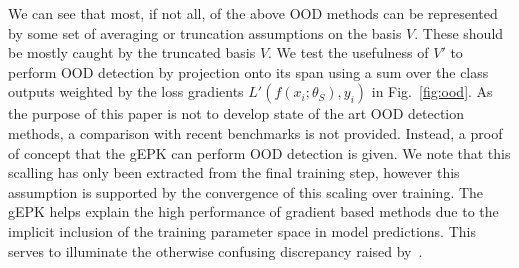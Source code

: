 We can see that most, if not all, of the above OOD methods can be
represented by some set of averaging or truncation assumptions on the
basis $V$. These should be mostly caught by the truncated basis
$V$. We test the usefulness of $V'$ to perform OOD detection by
projection onto its span using a sum over the class outputs weighted
by the loss gradients $L'(f(x_i; \theta_S), y_i)$ in
Fig.~\ref{fig:ood}. As the purpose of this paper is not to develop state of the art OOD detection methods, a comparison with recent benchmarks is not provided. Instead, a proof of concept that the gEPK can perform OOD detection is given. 
We note that this scalling has only been extracted
from the final training step, however this assumption is supported by
the convergence of this scaling over training. The gEPK helps explain the high performance of gradient based methods due to the implicit inclusion of the training parameter space in model predictions. This serves to illuminate the otherwise confusing discrepancy raised by~\citet{igoe2022}. 

